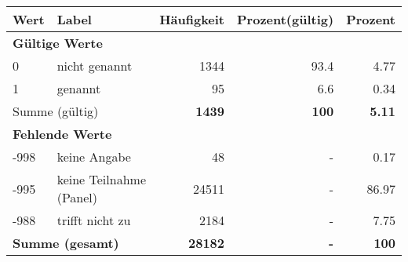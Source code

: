      \begin{longtable}{lXrrr}
     \toprule
     \textbf{Wert} & \textbf{Label} & \textbf{Häufigkeit} & \textbf{Prozent(gültig)} & \textbf{Prozent} \\
     \endhead
     \midrule
     \multicolumn{5}{l}{\textbf{Gültige Werte}}\\

     0 &
     \multicolumn{1}{X}{ nicht genannt   } &


       \num{1344} &
       \num[round-mode=places,round-precision=2]{93.4} &
         \num[round-mode=places,round-precision=2]{4.77} \\

     1 &
     \multicolumn{1}{X}{ genannt   } &


       \num{95} &
       \num[round-mode=places,round-precision=2]{6.6} &
         \num[round-mode=places,round-precision=2]{0.34} \\
     \midrule
     \multicolumn{2}{l}{Summe (gültig)} &
       \textbf{\num{1439}} &
     \textbf{100} &
       \textbf{\num[round-mode=places,round-precision=2]{5.11}} \\
     \multicolumn{5}{l}{\textbf{Fehlende Werte}}\\
       -998 &
       keine Angabe &
         \num{48} &
        - &
         \num[round-mode=places,round-precision=2]{0.17} \\
       -995 &
       keine Teilnahme (Panel) &
         \num{24511} &
        - &
         \num[round-mode=places,round-precision=2]{86.97} \\
       -988 &
       trifft nicht zu &
         \num{2184} &
        - &
         \num[round-mode=places,round-precision=2]{7.75} \\
     \midrule
     \multicolumn{2}{l}{\textbf{Summe (gesamt)}} &
          \textbf{\num{28182}} &
        \textbf{-} &
        \textbf{100} \\
     \bottomrule
     \end{longtable}
     
